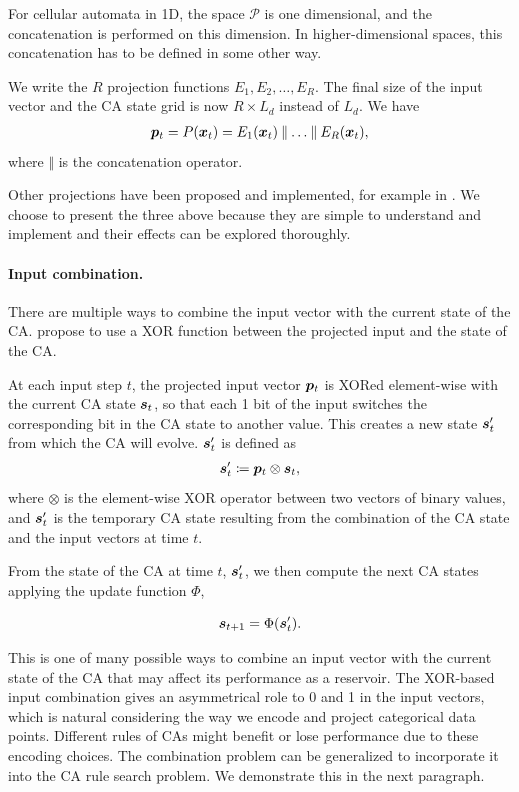 For cellular automata in 1D, the space $\mathcal{P}$ is one dimensional, and the
concatenation is performed on this dimension. In higher-dimensional spaces,
this concatenation has to be defined in some other way.

We write the $R$ projection functions $E_{1}, E_{2}, \ldots, E_{R}$. The final size
of the input vector and the CA state grid is now $R \times L_{d}$ instead of $L_{d}$.
We have
\begin{align}
  {\bm{p}}_{t} = P({\bm{x}}_{t}) = E_{1}({\bm{x}}_{t})\mathbin\Vert \ldots \mathbin \Vert E_{R}({\bm{x}}_{t}),
\end{align}
where $\mathbin\Vert$ is the concatenation operator.

Other projections have been proposed and implemented, for example in
\parencite{yilmazReservoirComputingUsing2014}. We choose to present the three
above because they are simple to understand and implement and their effects can
be explored thoroughly.

\paragraph{Input combination.}
There are multiple ways to combine the input vector with the current state of the \ac{CA}. \textcite{gloverDynamicalLandscapeReservoir2021} propose to use a XOR
function between the projected input and the state of the \ac{CA}.

At each input step $t$, the projected input vector ${\bm{p}}_{t}$ is XORed
element-wise with the current CA state ${\bm{s}}_{t}$, so that each 1 bit of the
input switches the corresponding bit in the CA state to another value. This
creates a new state ${\bm{s}}_{t}'$ from which the CA will evolve. ${\bm{s}}_{t}'$ is
defined as
\begin{align}
  {\bm{s}}_{t}' \coloneqq {\bm{p}}_{t} \otimes {\bm{s}}_{t},
\end{align}
where $\otimes$ is the element-wise XOR operator between two vectors of binary
values, and ${\bm{s}}'_{t}$ is the temporary CA state resulting from the combination
of the CA state and the input vectors at time $t$.

From the state of the \ac{CA} at time $t$, ${\bm{s}}'_{t}$, we then compute the next CA states
applying the update function $\Phi$,

\begin{equation}
  \label{eq:ca-state}
  {\bm{s}}_{t + 1} = \Phi({\bm{s}}'_{t}).
\end{equation}

This is one of many possible ways to combine an input vector with the current
state of the CA that may affect its performance as a reservoir. The XOR-based
input combination gives an asymmetrical role to 0 and 1 in the input vectors, which
is natural considering the way we encode and project categorical data
points. Different rules of \acp{CA} might benefit or lose performance due to these encoding choices. The combination problem can be generalized to
incorporate it into the \ac{CA} rule search problem. We demonstrate this in the
next paragraph.

